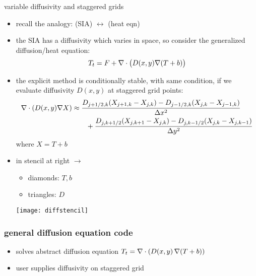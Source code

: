 \begin{frame}{variable diffusivity and staggered grids}

\begin{itemize}
  \item recall the analogy: \qquad (SIA) $\leftrightarrow$ (heat eqn)
  \item the SIA has a diffusivity which varies in space, so consider the generalized diffusion/heat equation:
     $$T_t = F + \nabla\cdot \big(D(x,y) \nabla (T+b)\big)$$
  \item the explicit method is conditionally stable, with same condition, if we evaluate diffusivity $D(x,y)$ at \alert{staggered} grid points:
  \small
\begin{align*}
\nabla\cdot \left(D(x,y) \nabla X\right) &\approx \frac{D_{j+1/2,k}(X_{j+1,k} - X_{j,k}) - D_{j-1/2,k}(X_{j,k} - X_{j-1,k})}{\Delta x^2} \\
	&\qquad + \frac{D_{j,k+1/2}(X_{j,k+1} - X_{j,k}) - D_{j,k-1/2}(X_{j,k} - X_{j,k-1})}{\Delta y^2}
\end{align*}
\normalsize
where $X=T+b$
\item in stencil at right $\longrightarrow$
    \begin{itemize}
    \item[] diamonds: $T,b$
    \item[] triangles: $D$
    \end{itemize}

\vspace{-15mm}
\hfill \texttt{[image: diffstencil]}
\end{itemize}
\end{frame}


\begin{frame}
  \frametitle{general diffusion equation code}


\small
\begin{itemize}
\item solves abstract diffusion equation $T_t = \nabla\cdot \left(D(x,y)\, \nabla (T+b)\right)$
\item user supplies diffusivity on staggered grid
\end{itemize}
\end{frame}


